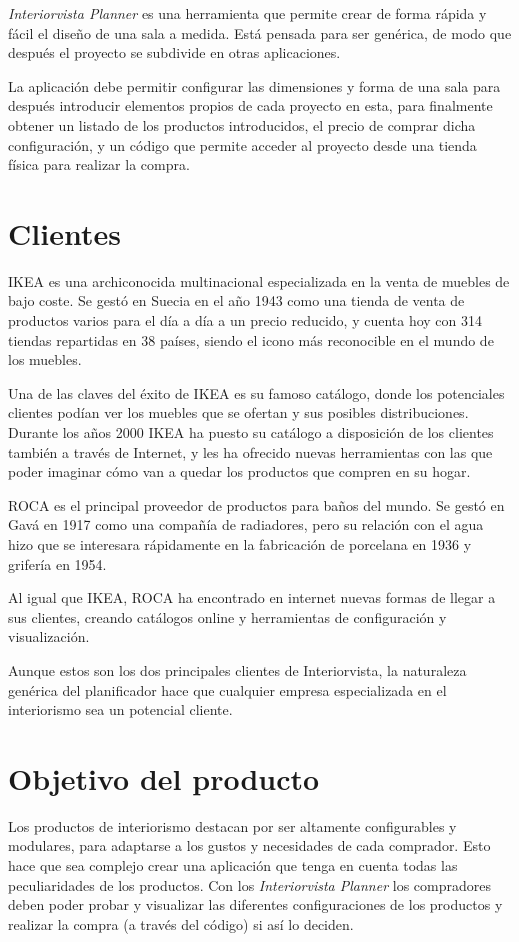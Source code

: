 \textit{Interiorvista Planner} es una herramienta que permite crear de forma rápida y fácil el diseño de una sala a medida. Está pensada para ser genérica, de modo que después el proyecto se subdivide en otras aplicaciones.

La aplicación debe permitir configurar las dimensiones y forma de una sala para después introducir elementos propios de cada proyecto en esta, para finalmente obtener un listado de los productos introducidos, el precio de comprar dicha configuración, y un código que permite acceder al proyecto desde una tienda física para realizar la compra.

\section{Clientes}
IKEA es una archiconocida multinacional especializada en la venta de muebles de bajo coste. Se gestó en Suecia en el año 1943 como una tienda de venta de productos varios para el día a día a un precio reducido, y cuenta hoy con 314 tiendas repartidas en 38 países, siendo el icono más reconocible en el mundo de los muebles.

Una de las claves del éxito de IKEA es su famoso catálogo, donde los potenciales clientes podían ver los muebles que se ofertan y sus posibles distribuciones. Durante los años 2000 IKEA ha puesto su catálogo a disposición de los clientes también a través de Internet, y les ha ofrecido nuevas herramientas con las que poder imaginar cómo van a quedar los productos que compren en su hogar.

ROCA es el principal proveedor de productos para baños del mundo. Se gestó en Gavá en 1917 como una compañía de radiadores, pero su relación con el agua hizo que se interesara rápidamente en la fabricación de porcelana en 1936 y grifería en 1954.

Al igual que IKEA, ROCA ha encontrado en internet nuevas formas de llegar a sus clientes, creando catálogos online y herramientas de configuración y visualización.

Aunque estos son los dos principales clientes de Interiorvista, la naturaleza genérica del planificador hace que cualquier empresa especializada en el interiorismo sea un potencial cliente.

\section{Objetivo del producto}
Los productos de interiorismo destacan por ser altamente configurables y modulares, para adaptarse a los gustos y necesidades de cada comprador. Esto hace que sea complejo crear una aplicación que tenga en cuenta todas las peculiaridades de los productos. Con los \textit{Interiorvista Planner} los compradores deben poder probar y visualizar las diferentes configuraciones de los productos y realizar la compra (a través del código) si así lo deciden.

